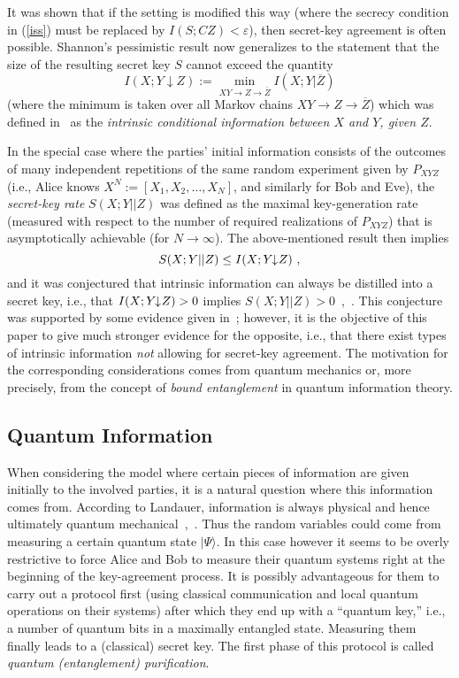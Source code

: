 \documentclass{article}
\newcommand{\ep}{\varepsilon}
\newcommand{\OZ}{\overline{Z}}
\newcommand{\ida}{I(X;Y\hspace{-1.3mm}\downarrow\hspace{-0.8mm} Z)}
\begin{document}
It was shown that if the setting is modified
this way
(where the secrecy condition in (\ref{iss}) must be replaced by 
$I(S;CZ)<\ep$), then secret-key agreement is often  possible. Shannon's 
pessimistic result now generalizes to the statement that the size 
of the resulting secret key $S$ cannot  exceed the quantity
\[
I(X;Y\downarrow Z):=\min_{XY\rightarrow Z\rightarrow \overline{Z}} I(X;Y|\OZ)
\]
(where the minimum is taken over all Markov chains 
$XY\rightarrow Z\rightarrow \overline{Z}$)
which was defined in~\cite{ittrans} as the {\em intrinsic
conditional information between $X$ and $Y$, given $Z$}.

In the special case where the parties' initial information consists of the 
outcomes of many independent repetitions of the same random experiment
given
by $P_{XYZ}$
(i.e., Alice knows $X^N:=[X_1,X_2,\ldots,X_N]$, and similarly for 
Bob and Eve),
the {\em secret-key rate\/} $S(X;Y||Z)$ was defined as the 
maximal
 key-generation rate (measured with respect 
to the number of required  realizations of $P_{XYZ}$)  that is 
 asymptotically achievable (for $N\rightarrow\infty$). The above-mentioned 
result then implies
\[
S(X;Y||Z)\leq \ida\ ,
\]
and it was conjectured that intrinsic information can always be distilled 
into a secret key, i.e., that $\ida>0$ implies $S(X;Y||Z)>0$~\cite{ittrans},\, 
\cite{diss}. 
This conjecture was supported by some evidence given in~\cite{ittrans};
however,
it is the objective of this paper to give much stronger evidence 
for the opposite, i.e., that there exist types of intrinsic information
{\em not\/} allowing for secret-key agreement. The motivation for the 
corresponding considerations comes from quantum mechanics or,  more 
precisely, from the concept of {\em bound entanglement\/} in 
quantum information theory.





\subsection{Quantum Information}\label{quantum}

When considering the model where certain pieces of information 
are given initially to the involved parties, it is a natural 
question where this information comes from. According to Landauer,
information is always physical and hence ultimately quantum 
mechanical~\cite{landau98},\, \cite{landau96}. 
Thus the random variables could come from measuring 
a certain quantum state $|\Psi\rangle$. In this case however
it seems to be overly restrictive to force Alice and Bob to measure 
their quantum systems right at the beginning of the key-agreement 
process. It is possibly  advantageous for them to 
carry out a protocol first (using classical communication and local
quantum operations on their systems) after which they end up 
with a ``quantum key,'' i.e., a number of quantum bits in a 
maximally entangled state. Measuring them finally 
leads to a (classical) secret key. The first phase of this protocol
is called {\em quantum (entanglement) purification}.
\end{document}
